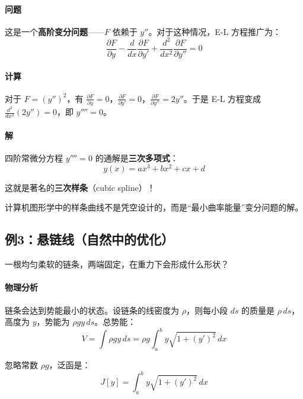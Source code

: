 \paragraph{问题}

这是一个\textbf{高阶变分问题}——$F$ 依赖于 $y''$。对于这种情况，E-L 方程推广为：
\[
\frac{\partial F}{\partial y} - \frac{d}{dx}\frac{\partial F}{\partial y'} + \frac{d^2}{dx^2}\frac{\partial F}{\partial y''} = 0
\]

\paragraph{计算}

对于 $F = (y'')^2$，有 $\frac{\partial F}{\partial y} = 0$，$\frac{\partial F}{\partial y'} = 0$，$\frac{\partial F}{\partial y''} = 2y''$。于是 E-L 方程变成 $\frac{d^2}{dx^2}(2y'') = 0$，即 $y'''' = 0$。

\paragraph{解}

四阶常微分方程 $y'''' = 0$ 的通解是\textbf{三次多项式}：
\[
y(x) = ax^3 + bx^2 + cx + d
\]

这就是著名的\textbf{三次样条}（cubic spline）！

\begin{insightbox}
计算机图形学中的样条曲线不是凭空设计的，而是“最小曲率能量”变分问题的解。
\end{insightbox}

\subsection{例3：悬链线（自然中的优化）}

一根均匀柔软的链条，两端固定，在重力下会形成什么形状？

\paragraph{物理分析}

链条会达到势能最小的状态。设链条的线密度为 $\rho$，则每小段 $ds$ 的质量是 $\rho \, ds$，高度为 $y$，势能为 $\rho g y \, ds$。总势能：
\[
V = \int \rho g y \, ds = \rho g \int_a^b y \sqrt{1 + (y')^2} \, dx
\]

忽略常数 $\rho g$，泛函是：
\[
J[y] = \int_a^b y \sqrt{1 + (y')^2} \, dx
\]

